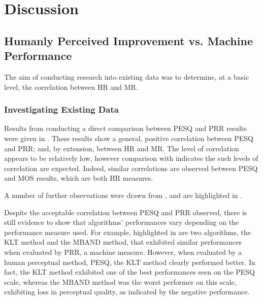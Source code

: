 
\chapter{Discussion}

\acresetall


\section{Humanly Perceived Improvement vs. Machine Performance}

The aim of conducting research into existing data was to determine,
at a basic level, the correlation between \ac{HR} and \ac{MR}.


\subsection{Investigating Existing Data}

Results from conducting a direct comparison between \ac{PESQ} and
\ac{PRR} results were given in . These results
show a general, positive correlation between \ac{PESQ} and \ac{PRR};
and, by extension, between \ac{HR} and \ac{MR}. The level of correlation
appears to be relatively low, however comparison with 
indicates the such levels of correlation are expected. Indeed, similar
correlations are observed between \ac{PESQ} and \ac{MOS} results,
which are both \ac{HR} measures.

A number of further observations were drawn from ,
and are highlighted in .

Despite the acceptable correlation between \ac{PESQ} and \ac{PRR}
observed, there is still evidence to show that algorithms' performances
vary depending on the performance measure used. For example, highlighted
in  are two algorithms, the \ac{KLT} method
and the \ac{MBAND} method, that exhibited similar performances when
evaluated by \ac{PRR}, a machine measure. However, when evaluated
by a human perceptual method, \ac{PESQ}, the \ac{KLT} method clearly
performed better. In fact, the \ac{KLT} method exhibited one of the
best performances seen on the \ac{PESQ} scale, whereas the \ac{MBAND}
method was the worst performer on this scale, exhibiting loss in perceptual
quality, as indicated by the negative performance.

